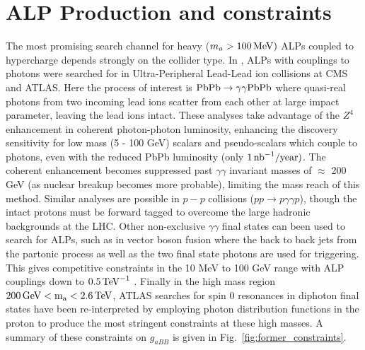 \documentclass[aps,onecolumn,twoside,secnumarabic,12pt,balancelastpage,amsmath,amssymb,nofootinbib,hyperref=pdftex]{revtex4}
\begin{document}
\section{ALP Production and constraints}
The most promising search channel for heavy ($m_{a} > 100\,\rm{MeV})$ ALPs coupled to hypercharge depends strongly on the collider type. In \cite{Knapen:2016moh,Aad:2020cje,Sirunyan:2018fhl}, ALPs with couplings to photons were searched for in Ultra-Peripheral Lead-Lead ion collisions at CMS and ATLAS. Here the process of interest is $\rm{PbPb}\rightarrow \gamma\gamma\rm{PbPb}$ where quasi-real photons from two incoming lead ions scatter from each other at large impact parameter, leaving the lead ions intact. These analyses take advantage of the $Z^{4}$ enhancement in coherent photon-photon luminosity, enhancing the discovery sensitivity for low mass (5 - 100 GeV) scalars and pseudo-scalars which couple to photons, even with the reduced PbPb luminosity (only $1\,\rm{nb}^{-1}/\rm{year})$. The coherent enhancement becomes suppressed past $\gamma\gamma$ invariant masses of $\approx$ 200 GeV (as nuclear breakup becomes more probable), limiting the mass reach of this method. Similar analyses are possible in $p-p$ collisions ($pp\rightarrow p\gamma\gamma p$), though the intact protons must be forward tagged to overcome the large hadronic backgrounds at the LHC\cite{Baldenegro:2018hng}. 
\vskip 0.12in
Other non-exclusive $\gamma\gamma$ final states can been used to search for ALPs, such as in vector boson fusion\cite{Florez:2021zoo} where the back to back jets from the partonic process as well as the two final state photons are used for triggering. This gives competitive constraints in the 10 MeV to 100 GeV range with ALP couplings down to $0.5\,\rm{TeV}^{-1}$ . Finally in the high mass region $200\,\rm{GeV} < m_{a} < 2.6\,\rm{TeV}$, ATLAS searches for spin 0 resonances in diphoton final states\cite{Aaboud:2017yyg} have been re-interpreted by employing photon distribution functions in the proton to produce the most stringent constraints at these high masses\cite{Bauer:2018uxu}. 
\vskip 0.12in
A summary of these constraints on $g_{aBB}$ is given in Fig.~\ref{fig:former_constraints}.
\end{document}
